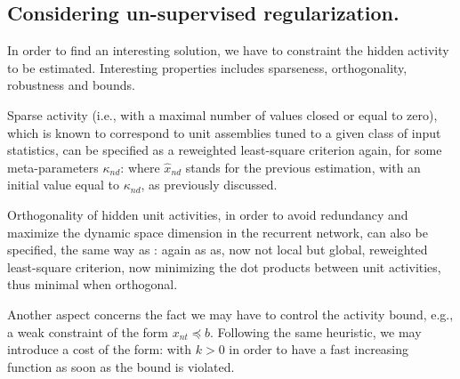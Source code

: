 \subsection*{Considering un-supervised regularization.}

In order to find an interesting solution, we have to constraint the hidden activity to be estimated. Interesting properties includes sparseness, orthogonality, robustness and bounds.

Sparse activity (i.e., with a maximal number of values closed or equal to zero), which is known to correspond to unit assemblies tuned to a given class of input statistics, can be specified as a reweighted least-square criterion again, for some meta-parameters $\kappa_{nd}$:
where $\hat{x}_{nd}$ stands for the previous estimation, with an initial value equal to $\kappa_{nd}$, as previously discussed.

Orthogonality of hidden unit activities, in order to avoid redundancy and maximize the dynamic space dimension in the recurrent network, can also be specified, the same way as :
again as as, now not local but global, reweighted least-square criterion, now minimizing the dot products between unit activities, thus minimal when orthogonal. 

Another aspect concerns the fact we may have to control the activity bound, e.g., a weak constraint of the form $x_{nt} \preceq b$. Following the same heuristic, we may introduce a cost of the form:
with $k > 0$ in order to have a fast increasing function as soon as the bound is violated.
